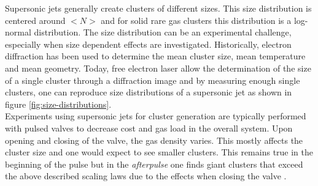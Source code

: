 Supersonic jets generally create clusters of different sizes. This size distribution is centered around $<N>$ and for solid rare gas clusters this distribution is a log-normal distribution. The size distribution can be an experimental challenge, especially when size dependent effects are investigated. Historically, electron diffraction \cite{Farges-1981-SurfSci,Bartell-1986-ChemRev} has been used to determine the mean cluster size, mean temperature and mean geometry. Today, free electron laser allow the determination of the size of a single cluster through a diffraction image and by measuring enough single clusters, one can reproduce size distributions of a supersonic jet as shown in figure \ref{fig:size-distributions}.\\
Experiments using supersonic jets for cluster generation are typically performed with pulsed valves to decrease cost and gas load in the overall system. Upon opening and closing of the valve, the gas density varies. This mostly affects the cluster size and one would expect to see smaller clusters. This remains true in the beginning of the pulse but in the \textit{afterpulse} one finds giant clusters that exceed the above described scaling laws due to the effects when closing the valve \cite{Rupp-2014-JCP}.
%
%
%
%
%
